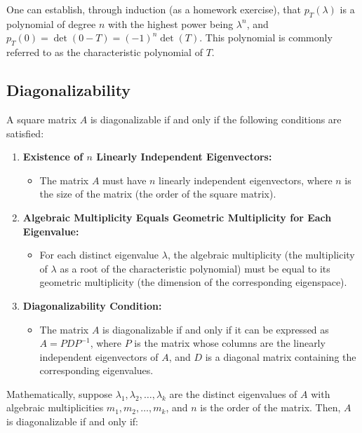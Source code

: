 One can establish, through induction (as a homework exercise), that $p_T(\lambda)$ is a polynomial of degree $n$ with the highest power being $\lambda^n$, and $p_T(0) = \det(0 - T) = (-1)^n \det(T)$. This polynomial is commonly referred to as the characteristic polynomial of $T$.


\subsection{Diagonalizability}

A square matrix $A$ is diagonalizable if and only if the following conditions are satisfied:

\begin{enumerate}
    \item \textbf{Existence of \(n\) Linearly Independent Eigenvectors:}
    \begin{itemize}
        \item The matrix $A$ must have $n$ linearly independent eigenvectors, where $n$ is the size of the matrix (the order of the square matrix).
    \end{itemize}

    \item \textbf{Algebraic Multiplicity Equals Geometric Multiplicity for Each Eigenvalue:}
    \begin{itemize}
        \item For each distinct eigenvalue $\lambda$, the algebraic multiplicity (the multiplicity of $\lambda$ as a root of the characteristic polynomial) must be equal to its geometric multiplicity (the dimension of the corresponding eigenspace).
    \end{itemize}

    \item \textbf{Diagonalizability Condition:}
    \begin{itemize}
        \item The matrix $A$ is diagonalizable if and only if it can be expressed as $A = PDP^{-1}$, where $P$ is the matrix whose columns are the linearly independent eigenvectors of $A$, and $D$ is a diagonal matrix containing the corresponding eigenvalues.
    \end{itemize}
\end{enumerate}

Mathematically, suppose $\lambda_1, \lambda_2, \ldots, \lambda_k$ are the distinct eigenvalues of $A$ with algebraic multiplicities $m_1, m_2, \ldots, m_k$, and $n$ is the order of the matrix. Then, $A$ is diagonalizable if and only if:


